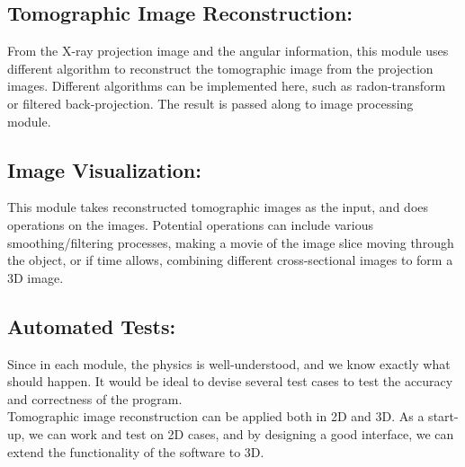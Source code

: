 \documentclass[11]{article}
\begin{document}
	\subsection{Tomographic Image Reconstruction:}
		From the X-ray projection image and the angular information, this module uses different algorithm to reconstruct the tomographic image from the projection images. Different algorithms can be implemented here, such as radon-transform or filtered back-projection. The result is passed along to image processing module.

	\subsection{Image Visualization:}
		This module takes reconstructed tomographic images as the input, and does operations on the images. Potential operations can include various smoothing/filtering processes, making a movie of the image slice moving through the object, or if time allows, combining different cross-sectional images to form a 3D image. 
	\subsection{Automated Tests:}
		Since in each module, the physics is well-understood, and we know exactly what should happen. It would be ideal to devise several test cases to test the accuracy and correctness of the program.\\ Tomographic image reconstruction can be applied both in 2D and 3D. As a start-up, we can work and test on 2D cases, and by designing a good interface, we can extend the functionality of the software to 3D.
\end{document}
